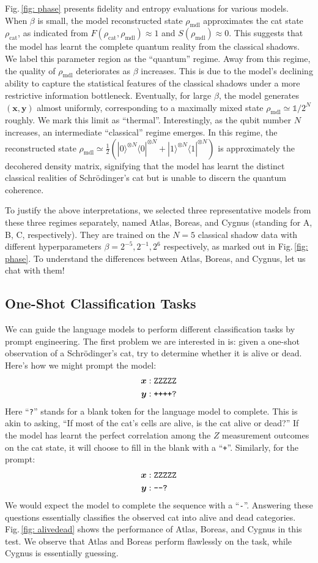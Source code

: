 \documentclass[fleqn,11pt]{wlscirep}
\newcommand{\bra}[1]{\langle #1|}
\newcommand{\ket}[1]{|#1 \rangle}
\newcommand{\id}{\mathds{1}}
\newcommand{\vect}[1]{{\bm{#1}}}
\newcommand{\ttt}[1]{{\text{\texttt{#1}}}}
\newcommand{\eqs}[1]{\begin{equation}\begin{split}#1\end{split}\end{equation}}
\newcommand{\figref}[1]{Fig.\,\ref{#1}}
\begin{document}
\figref{fig: phase} presents fidelity and entropy evaluations for various models. When $\beta$ is small, the model reconstructed state $\rho_\text{mdl}$ approximates the cat state $\rho_\text{cat}$, as indicated from $F(\rho_\text{cat}, \rho_\text{mdl})\approx 1$ and $S(\rho_\text{mdl}) \approx 0$. This suggests that the model has learnt the complete quantum reality from the classical shadows. We label this parameter region as the ``quantum'' regime. Away from this regime, the quality of $\rho_\text{mdl}$ deteriorates as $\beta$ increases. This is due to the model's declining ability to capture the statistical features of the classical shadows under a more restrictive information bottleneck. Eventually, for large $\beta$, the model generates $(\vect{x},\vect{y})$ almost uniformly, corresponding to a maximally mixed state $\rho_\text{mdl}\simeq \id /2^N$ roughly. We mark this limit as ``thermal''. Interestingly, as the qubit number $N$ increases, an intermediate ``classical'' regime emerges. In this regime, the reconstructed state $\rho_\text{mdl}\simeq \frac{1}{2}(\ket{0}^{\otimes N}\bra{0}^{\otimes N}+\ket{1}^{\otimes N}\bra{1}^{\otimes N})$ is approximately the decohered density matrix, signifying that the model has learnt the distinct classical realities of Schrödinger's cat but is unable to discern the quantum coherence. 

To justify the above interpretations, we selected three representative models from these three regimes separately, named Atlas, Boreas, and Cygnus (standing for A, B, C, respectively). They are trained on the $N=5$ classical shadow data with different hyperparameters $\beta=2^{-5},2^{-1},2^{6}$ respectively, as marked out in \figref{fig: phase}. To understand the differences between Atlas, Boreas, and Cygnus, let us chat with them!

\subsection*{One-Shot Classification Tasks}

We can guide the language models to perform different classification tasks by prompt engineering. The first problem we are interested in is: given a one-shot observation of a Schrödinger’s cat, try to determine whether it is alive or dead. Here's how we might prompt the model:
\eqs{\label{eq: cat +}
\vect{x}&: \ttt{ZZZZZ}\\
\vect{y}&: \ttt{++++?}}
Here ``\texttt{?}'' stands for a blank token for the language model to complete. This is akin to asking, ``If most of the cat's cells are alive, is the cat alive or dead?'' If the model has learnt the perfect correlation among the $Z$ measurement outcomes on the cat state, it will choose to fill in the blank with a ``\texttt{+}''. Similarly, for the prompt:
\eqs{\label{eq: cat -}
\vect{x}&: \ttt{ZZZZZ}\\
\vect{y}&: \ttt{----?}}
We would expect the model to complete the sequence with a ``\texttt{-}''. Answering these questions essentially classifies the observed cat into alive and dead categories. \figref{fig: alivedead} shows the performance of Atlas, Boreas, and Cygnus in this test. We observe that Atlas and Boreas perform flawlessly on the task, while Cygnus is essentially guessing.
\end{document}
